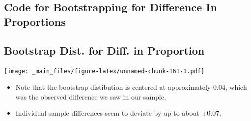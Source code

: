 \documentclass[]{book}
\newenvironment{Shaded}{\begin{snugshade}}{\end{snugshade}}
\newcommand{\KeywordTok}[1]{\textcolor[rgb]{0.13,0.29,0.53}{\textbf{#1}}}
\newcommand{\DataTypeTok}[1]{\textcolor[rgb]{0.13,0.29,0.53}{#1}}
\newcommand{\DecValTok}[1]{\textcolor[rgb]{0.00,0.00,0.81}{#1}}
\newcommand{\StringTok}[1]{\textcolor[rgb]{0.31,0.60,0.02}{#1}}
\newcommand{\OtherTok}[1]{\textcolor[rgb]{0.56,0.35,0.01}{#1}}
\newcommand{\ControlFlowTok}[1]{\textcolor[rgb]{0.13,0.29,0.53}{\textbf{#1}}}
\newcommand{\OperatorTok}[1]{\textcolor[rgb]{0.81,0.36,0.00}{\textbf{#1}}}
\newcommand{\NormalTok}[1]{#1}
\begin{document}
\subsection{Code for Bootstrapping for Difference In
Proportions}\label{code-for-bootstrapping-for-difference-in-proportions}

\begin{Shaded}
\end{Shaded}

\subsection{Bootstrap Dist. for Diff. in
Proportion}\label{bootstrap-dist.-for-diff.-in-proportion}

\texttt{[image: \_main\_files/figure-latex/unnamed-chunk-161-1.pdf]}

\begin{itemize}
\item
  Note that the bootstrap distibution is centered at approximately 0.04,
  which was the observed difference we saw in our sample.
\item
  Individual sample differences seem to deviate by up to about
  \(\pm 0.07\).
\end{itemize}
\end{document}
